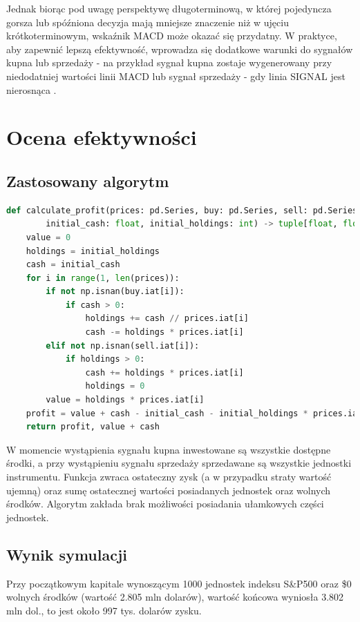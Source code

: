 \documentclass{article}
\begin{document}
Jednak biorąc pod uwagę perspektywę długoterminową, w której pojedyncza gorsza lub spóźniona decyzja mają mniejsze znaczenie niż w ujęciu krótkoterminowym, wskaźnik MACD może okazać się przydatny. W praktyce, aby zapewnić lepszą efektywność, wprowadza się dodatkowe warunki do sygnałów kupna lub sprzedaży - na przykład sygnał kupna zostaje wygenerowany przy niedodatniej wartości linii MACD lub sygnał sprzedaży - gdy linia SIGNAL jest nierosnąca \cite{web:ing}.

\section{Ocena efektywności}

\subsection{Zastosowany algorytm}

\begin{lstlisting}[language=Python, caption=Algorytm symulujący zysk/stratę, captionpos=b]
def calculate_profit(prices: pd.Series, buy: pd.Series, sell: pd.Series, \
        initial_cash: float, initial_holdings: int) -> tuple[float, float]:
    value = 0
    holdings = initial_holdings
    cash = initial_cash
    for i in range(1, len(prices)):
        if not np.isnan(buy.iat[i]):
            if cash > 0:
                holdings += cash // prices.iat[i]
                cash -= holdings * prices.iat[i]
        elif not np.isnan(sell.iat[i]):
            if holdings > 0:
                cash += holdings * prices.iat[i]
                holdings = 0
        value = holdings * prices.iat[i]
    profit = value + cash - initial_cash - initial_holdings * prices.iat[0]
    return profit, value + cash
\end{lstlisting}

W momencie wystąpienia sygnału kupna inwestowane są wszystkie dostępne środki, a przy wystąpieniu sygnału sprzedaży sprzedawane są wszystkie jednostki instrumentu. Funkcja zwraca ostateczny zysk (a w przypadku straty wartość ujemną) oraz sumę ostatecznej wartości posiadanych jednostek oraz wolnych środków. Algorytm zakłada brak możliwości posiadania ułamkowych części jednostek.

\subsection{Wynik symulacji}

Przy początkowym kapitale wynoszącym 1000 jednostek indeksu S\&P500 oraz \$0 wolnych środków (wartość 2.805 mln dolarów), wartość końcowa wyniosła 3.802 mln dol., to jest około 997 tys. dolarów zysku.
\end{document}
